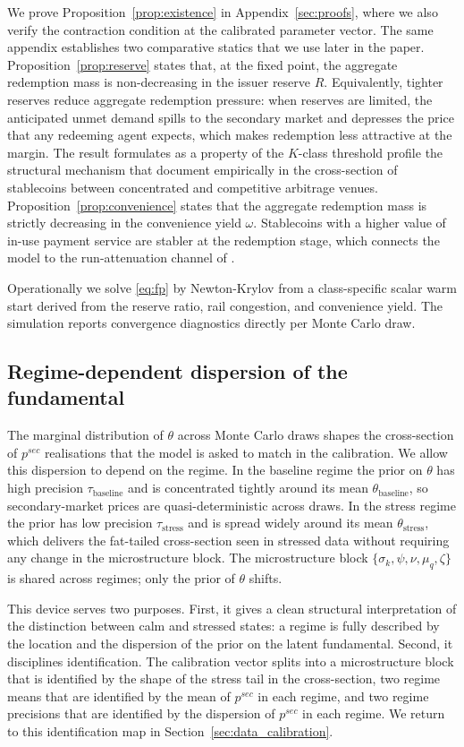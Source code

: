 We prove Proposition~\ref{prop:existence} in Appendix~\ref{sec:proofs}, where we also verify the contraction condition at the calibrated parameter vector. The same appendix establishes two comparative statics that we use later in the paper. Proposition~\ref{prop:reserve} states that, at the fixed point, the aggregate redemption mass is non-decreasing in the issuer reserve $R$. Equivalently, tighter reserves reduce aggregate redemption pressure: when reserves are limited, the anticipated unmet demand spills to the secondary market and depresses the price that any redeeming agent expects, which makes redemption less attractive at the margin. The result formulates as a property of the $K$-class threshold profile the structural mechanism that \citet{ma_zeng_zhang_2025} document empirically in the cross-section of stablecoins between concentrated and competitive arbitrage venues. Proposition~\ref{prop:convenience} states that the aggregate redemption mass is strictly decreasing in the convenience yield $\omega$. Stablecoins with a higher value of in-use payment service are stabler at the redemption stage, which connects the model to the run-attenuation channel of \citet{bertsch_2025_adoption_fragility}.

Operationally we solve \eqref{eq:fp} by Newton-Krylov from a class-specific scalar warm start derived from the reserve ratio, rail congestion, and convenience yield. The simulation reports convergence diagnostics directly per Monte Carlo draw.

\subsection{Regime-dependent dispersion of the fundamental}\label{sub:regime}

The marginal distribution of $\theta$ across Monte Carlo draws shapes the cross-section of $p^{sec}$ realisations that the model is asked to match in the calibration. We allow this dispersion to depend on the regime. In the baseline regime the prior on $\theta$ has high precision $\tau_{\text{baseline}}$ and is concentrated tightly around its mean $\theta_{\text{baseline}}$, so secondary-market prices are quasi-deterministic across draws. In the stress regime the prior has low precision $\tau_{\text{stress}}$ and is spread widely around its mean $\theta_{\text{stress}}$, which delivers the fat-tailed cross-section seen in stressed data without requiring any change in the microstructure block. The microstructure block $\{\sigma_k, \psi, \nu, \mu_q, \zeta\}$ is shared across regimes; only the prior of $\theta$ shifts.

This device serves two purposes. First, it gives a clean structural interpretation of the distinction between calm and stressed states: a regime is fully described by the location and the dispersion of the prior on the latent fundamental. Second, it disciplines identification. The calibration vector splits into a microstructure block that is identified by the shape of the stress tail in the cross-section, two regime means that are identified by the mean of $p^{sec}$ in each regime, and two regime precisions that are identified by the dispersion of $p^{sec}$ in each regime. We return to this identification map in Section~\ref{sec:data_calibration}.
